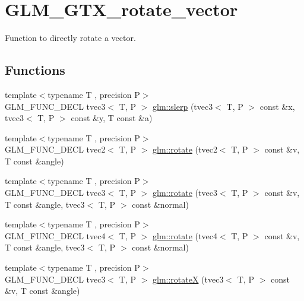 \hypertarget{group__gtx__rotate__vector}{\section{G\-L\-M\-\_\-\-G\-T\-X\-\_\-rotate\-\_\-vector}
\label{group__gtx__rotate__vector}
}


Function to directly rotate a vector.  


\subsection*{Functions}
\begin{DoxyCompactItemize}
\item 
{\footnotesize template$<$typename T , precision P$>$ }\\G\-L\-M\-\_\-\-F\-U\-N\-C\-\_\-\-D\-E\-C\-L tvec3$<$ T, P $>$ \hyperlink{group__gtx__rotate__vector_gafc9ab3101c3f3799f3d5d6d9d3baac09}{glm\-::slerp} (tvec3$<$ T, P $>$ const \&x, tvec3$<$ T, P $>$ const \&y, T const \&a)
\item 
{\footnotesize template$<$typename T , precision P$>$ }\\G\-L\-M\-\_\-\-F\-U\-N\-C\-\_\-\-D\-E\-C\-L tvec2$<$ T, P $>$ \hyperlink{group__gtx__rotate__vector_ga9bff444fb191e2e089a906b899cd033d}{glm\-::rotate} (tvec2$<$ T, P $>$ const \&v, T const \&angle)
\item 
{\footnotesize template$<$typename T , precision P$>$ }\\G\-L\-M\-\_\-\-F\-U\-N\-C\-\_\-\-D\-E\-C\-L tvec3$<$ T, P $>$ \hyperlink{group__gtx__rotate__vector_ga526b6f8995bc0946aa1a04e9297de7c6}{glm\-::rotate} (tvec3$<$ T, P $>$ const \&v, T const \&angle, tvec3$<$ T, P $>$ const \&normal)
\item 
{\footnotesize template$<$typename T , precision P$>$ }\\G\-L\-M\-\_\-\-F\-U\-N\-C\-\_\-\-D\-E\-C\-L tvec4$<$ T, P $>$ \hyperlink{group__gtx__rotate__vector_gaf4d59dd2f668f9ffb38048055d1316bd}{glm\-::rotate} (tvec4$<$ T, P $>$ const \&v, T const \&angle, tvec3$<$ T, P $>$ const \&normal)
\item 
{\footnotesize template$<$typename T , precision P$>$ }\\G\-L\-M\-\_\-\-F\-U\-N\-C\-\_\-\-D\-E\-C\-L tvec3$<$ T, P $>$ \hyperlink{group__gtx__rotate__vector_ga0c2dc9f8507bffcbb957db9818b18508}{glm\-::rotate\-X} (tvec3$<$ T, P $>$ const \&v, T const \&angle)
\item 

\end{DoxyCompactItemize}
